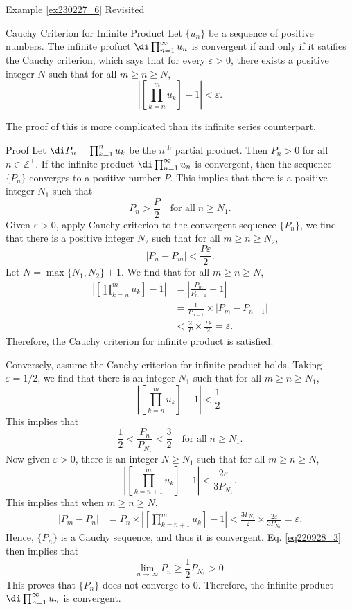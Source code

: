 \begin{example}{\linkt Example \ref{ex230227_6} Revisited}
\begin{example}[label=ex230227_13]{}
\begin{theorem}{Cauchy Criterion for Infinite Product} 
Let $\{u_n\}$ be a sequence of positive  numbers. The infinite profuct $\di\prod_{n=1}^{\infty}u_n$ is convergent if and only if it satifies the Cauchy criterion, which says that for every $\varepsilon>0$, there exists a positive integer $N$ such that for all $m\geq n\geq N$,
\[\left|\left[\prod_{k=n}^m u_k\right]-1\right|<\varepsilon.\]
\end{theorem}
The proof of this is more complicated than its infinite series counterpart.
\begin{myproof}{Proof}
 Let
$\di P_n= \prod_{k=1}^{n} u_k$ be the $n^{\text{th}}$ partial product. Then $P_n>0$ for all $n\in\mathbb{Z}^+$.
If the infinite product $\di\prod_{n=1}^{\infty}u_n$ is convergent, then the sequence $\{P_n\}$ converges to a positive number $P$. This implies that there is a positive integer $N_1$ such that 
\[P_n>\frac{P}{2}\quad  \text{for all}\; n\geq N_1.\] Given $\varepsilon>0$, apply Cauchy criterion to the convergent sequence $\{P_n\}$, we find that there is a positive integer $N_2$ such that for all $m\geq n\geq N_2$,
\[|P_n-P_{m}|<\frac{P\varepsilon}{2}.\] \bp
Let $N=\max\{N_1, N_2\}+1$.
We find that for all $ m\geq n\geq N$,
\begin{align*}
\left|\left[\prod_{k=n}^m u_k\right]-1\right|&=\left|\frac{P_m}{P_{n-1}}-1\right|\\
&=\frac{1}{P_{n-1}}\times\left|P_m-P_{n-1}\right|\\
&<\frac{2}{P}\times\frac{P\varepsilon}{2}=\varepsilon.
\end{align*}
Therefore, the Cauchy criterion for infinite product is satisfied. 

Conversely, assume the Cauchy criterion for infinite product holds. Taking $\varepsilon=1/2$, we find that there is an integer $N_1$ such that for all $m\geq n\geq N_1$,
\[\left|\left[\prod_{k=n}^m u_k\right]-1\right|< \frac{1}{2}.\]This implies that  
\begin{equation}\label{eq220928_3}\frac{1}{2}< \frac{P_n}{P_{N_1}} <\frac{3}{2}\quad\text{for all}\; n\geq N_1. \end{equation} 
Now given $\varepsilon>0$, there is an integer $N\geq N_1$ such that for all $m\geq n\geq N$,
\[\left|\left[\prod_{k=n+1}^m u_k\right]-1\right|< \frac{ 2\varepsilon}{3 P_{N_1} }.\]
This implies that when $m\geq n\geq N$,
\begin{align*}
|P_m-P_{n}|&=P_n\times \left|\left[\prod_{k=n+1}^m u_k\right]-1\right|<\frac{3P_{N_1}}{ 2 }\times  \frac{2 \varepsilon}{3 P_{N_1}}=\varepsilon.
\end{align*} Hence, $\{P_n\}$ is a Cauchy sequence, and thus it is convergent. Eq. \eqref{eq220928_3} then implies that \[\lim_{n\rightarrow \infty}P_n\geq\frac{1}{2}P_{N_1}>0.\]This proves that $\{P_n\}$ does not converge to 0. Therefore, the infinite product $\di\prod_{n=1}^{\infty}u_n$ is convergent.


\end{myproof}
\end{example}
\end{example}
